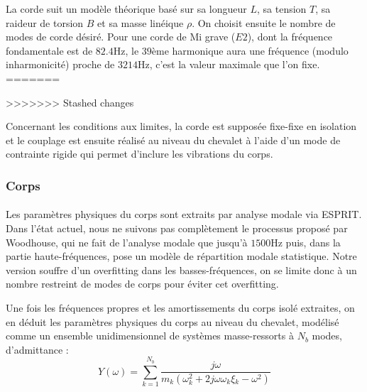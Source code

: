   La corde suit un modèle théorique basé sur sa longueur \( L \), sa tension
\( T \), sa raideur de torsion \( B \) et sa masse linéique \( \rho{} \).
  On choisit ensuite le nombre de modes de corde désiré.
  Pour une corde de Mi grave (\( E2 \)), dont la fréquence fondamentale est
de \( \si{82.4 \hertz}\), le \( 39 \)ème harmonique aura une fréquence (modulo 
inharmonicité) proche de \( \si{3214\hertz} \), c'est la valeur maximale que
l'on fixe.
=======

>>>>>>> Stashed changes

  Concernant les conditions aux limites, la corde est supposée fixe-fixe
en isolation et le couplage est ensuite réalisé au niveau du chevalet à l'aide
d'un mode de contrainte rigide qui permet d'inclure les vibrations du corps.

\subsubsection{Corps}

  \paragraph{}
  Les paramètres physiques du corps sont extraits par analyse modale via ESPRIT.
Dans l'état actuel, nous ne suivons pas complètement le processus proposé par
Woodhouse, qui ne fait de l'analyse modale que jusqu'à \( \si{1500\hertz} \)
puis, dans la partie haute-fréquences, pose un modèle de répartition modale
statistique.
Notre version souffre d'un overfitting dans les basses-fréquences, on se limite
donc à un nombre restreint de modes de corps pour éviter cet overfitting.

  Une fois les fréquences propres et les amortissements du corps isolé
extraites, on en déduit les paramètres physiques du corps au niveau du
chevalet, modélisé comme un ensemble unidimensionnel de systèmes masse-ressorts
à \( N_b \) modes, d'admittance :
  \[ Y(\omega) = \sum_{k=1}^{N_b} \frac{j\omega{}}
    {m_k(\omega_k^2 + 2 j \omega{} \omega{}_k \xi{}_k - \omega{}^2)} \]
    
